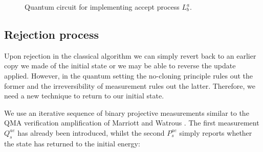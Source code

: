 \documentclass[aps,floatfix,10pt,amssymb,amsfont,amsmath,superscriptaddress,float,nofootinbib,longbibliography,nobalancelastpage,twocolumn]{revtex4-2}
\begin{document}
\begin{figure}

\caption{Quantum circuit for implementing accept process $L_b^a$.}
\label{fig:LQ_circuit}
\end{figure}
\subsection{Rejection process}
Upon rejection in the classical algorithm we can simply revert back to an earlier copy we made of the initial state or we may be able to reverse the update applied. However, in the quantum setting the no-cloning principle rules out the former and the irreversibility of measurement rules out the latter. Therefore, we need a new technique to return to our initial state.

We use an iterative sequence of binary projective measurements similar to the QMA verification amplification of Marriott and Watrous \cite{MarriottWatrous}. The first measurement $Q_s^{ae}$ has already been introduced, whilst the second $P_s^{ae}$ simply reports whether the state has returned to the initial energy:
\end{document}
